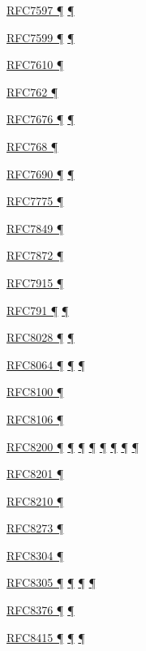 \documentclass[
]{article}
\begin{document}
\hyperref[dual-stack-scenarios]{RFC7597 ¶}
\hyperref[translation-and-ipv4-as-a-service]{¶}

\hyperref[dual-stack-scenarios]{RFC7599 ¶}
\hyperref[translation-and-ipv4-as-a-service]{¶}

\hyperref[layer-2-considerations]{RFC7610 ¶}

\hyperref[why-version-6]{RFC762 ¶}

\hyperref[layer-2-functions]{RFC7676 ¶} \hyperref[tunnels]{¶}

\hyperref[transport-protocols]{RFC768 ¶}

\hyperref[extension-headers-and-options]{RFC7690 ¶}
\hyperref[packet-size-and-jumbo-frames]{¶}

\hyperref[routing]{RFC7775 ¶}

\hyperref[layer-2-considerations]{RFC7849 ¶}

\hyperref[extension-headers-and-options]{RFC7872 ¶}

\hyperref[translation-and-ipv4-as-a-service]{RFC7915 ¶}

\hyperref[why-version-6]{RFC791 ¶}
\hyperref[traffic-class-and-flow-label]{¶}

\hyperref[auto-configuration]{RFC8028 ¶}
\hyperref[multi-prefix-operation]{¶}

\hyperref[addresses]{RFC8064 ¶} \hyperref[auto-configuration]{¶}
\hyperref[layer-2-functions]{¶}

\hyperref[traffic-class-and-flow-label]{RFC8100 ¶}

\hyperref[auto-configuration]{RFC8106 ¶}

\hyperref[how-to-keep-up-to-date]{RFC8200 ¶}
\hyperref[ipv6-basic-technology]{¶} \hyperref[address-resolution]{¶}
\hyperref[extension-headers-and-options]{¶} \hyperref[packet-format]{¶}
\hyperref[further-reading]{¶} \hyperref[filtering]{¶}
\hyperref[markdown-usage]{¶}

\hyperref[packet-size-and-jumbo-frames]{RFC8201 ¶}

\hyperref[filtering]{RFC8210 ¶}

\hyperref[prefix-per-host]{RFC8273 ¶}

\hyperref[transport-protocols]{RFC8304 ¶}

\hyperref[how-an-application-programmer-sees-ipv6]{RFC8305 ¶}
\hyperref[dual-stack-scenarios]{¶} \hyperref[multihoming]{¶}
\hyperref[deployment-in-the-home]{¶}

\hyperref[layer-2-functions]{RFC8376 ¶} \hyperref[energy-consumption]{¶}

\hyperref[managed-configuration]{RFC8415 ¶}
\hyperref[address-planning]{¶} \hyperref[prefix-per-host]{¶}
\end{document}
